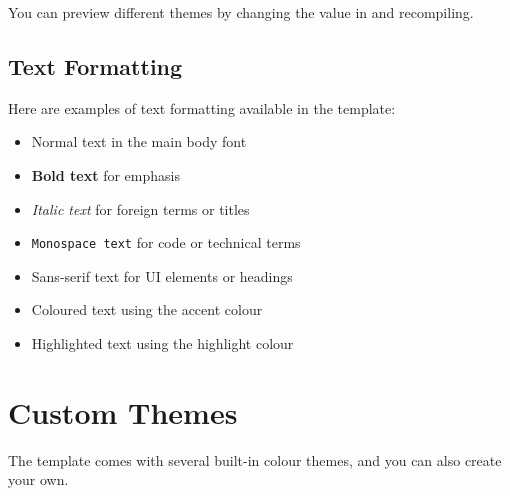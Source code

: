 \documentclass[a4paper,11pt]{article}
\begin{document}
You can preview different themes by changing the \inlinecode{\\fonttheme} value in  and recompiling.

\subsection{Text Formatting}

Here are examples of text formatting available in the template:

\begin{itemize}
    \item Normal text in the main body font
    \item \textbf{Bold text} for emphasis
    \item \textit{Italic text} for foreign terms or titles
    \item \texttt{Monospace text} for code or technical terms
    \item \textsf{Sans-serif text} for UI elements or headings
    \item \textcolor{accentcolor}{Coloured text} using the accent colour
    \item \textcolor{highlightcolor}{Highlighted text} using the highlight colour
\end{itemize}

\section{Custom Themes}
The template comes with several built-in colour themes, and you can also create your own.
\end{document}
